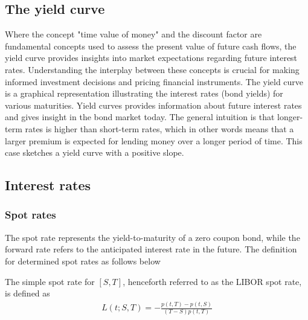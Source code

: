 \subsection{The yield curve}
Where the concept "time value of money" and the discount factor are fundamental concepts used to assess the present value of future
cash flows, the yield curve provides insights into market expectations regarding future interest rates.
Understanding the interplay between these concepts is crucial for making informed investment decisions and pricing
financial instruments. The yield curve is a graphical representation illustrating the interest rates (bond yields) for various maturities.
Yield curves provides information about future interest rates and gives insight in the bond market today. 
The general intuition is that longer-term rates is higher than short-term rates, which in other words means that a
larger premium is expected for lending money over a longer period of time. This case sketches a yield curve with a 
positive slope.
\subsection{Interest rates}
\subsubsection{Spot rates}
The spot rate represents the yield-to-maturity of a zero coupon bond,
while the forward rate refers to the anticipated interest rate in the 
future. The definition for determined spot rates as follows 
below
\begin{definition}\label{def:spot}
    The simple spot rate for $[S,T]$, henceforth referred to as the 
    LIBOR spot rate, is defined as \cite{Bjork} 
    \begin{align*}
        L(t;S,T) = - \frac{p(t,T)-p(t,S)}{(T-S)p(t,T)}
    \end{align*}
\end{definition} 
